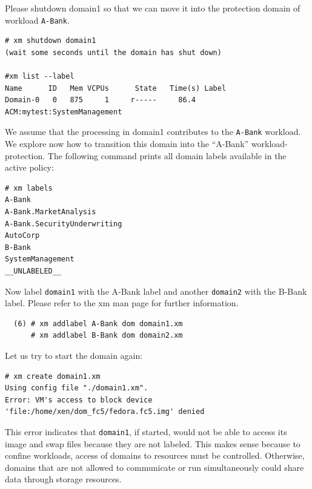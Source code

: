 \documentclass[11pt,twoside,final,openright]{report}
\begin{document}
Please shutdown domain1 so that we can move it into the protection
domain of workload \verb|A-Bank|.

\begin{scriptsize}
\begin{verbatim}
# xm shutdown domain1
(wait some seconds until the domain has shut down)

#xm list --label
Name      ID   Mem VCPUs      State   Time(s) Label
Domain-0   0   875     1     r-----     86.4  ACM:mytest:SystemManagement
\end{verbatim}
\end{scriptsize}

We assume that the processing in domain1 contributes to the \verb|A-Bank| workload.
We explore now how to transition this domain into the ``A-Bank'' workload-protection.
The following command prints all domain labels available in the active policy:

\begin{scriptsize}
\begin{verbatim}
# xm labels
A-Bank
A-Bank.MarketAnalysis
A-Bank.SecurityUnderwriting
AutoCorp
B-Bank
SystemManagement
__UNLABELED__
\end{verbatim}
\end{scriptsize}

Now label \verb|domain1| with the A-Bank label and another \verb|domain2|
with the B-Bank label. Please refer to the xm man page for
further information.

\begin{verbatim}
  (6) # xm addlabel A-Bank dom domain1.xm
      # xm addlabel B-Bank dom domain2.xm
\end{verbatim}

Let us try to start the domain again:

\begin{scriptsize}
\begin{verbatim}
# xm create domain1.xm
Using config file "./domain1.xm".
Error: VM's access to block device 'file:/home/xen/dom_fc5/fedora.fc5.img' denied
\end{verbatim}
\end{scriptsize}

This error indicates that \verb|domain1|, if started, would not be able to
access its image and swap files because they are not labeled.  This
makes sense because to confine workloads, access of domains to
resources must be controlled.  Otherwise, domains that are not allowed
to communicate or run simultaneously could share data through storage
resources.
\end{document}
